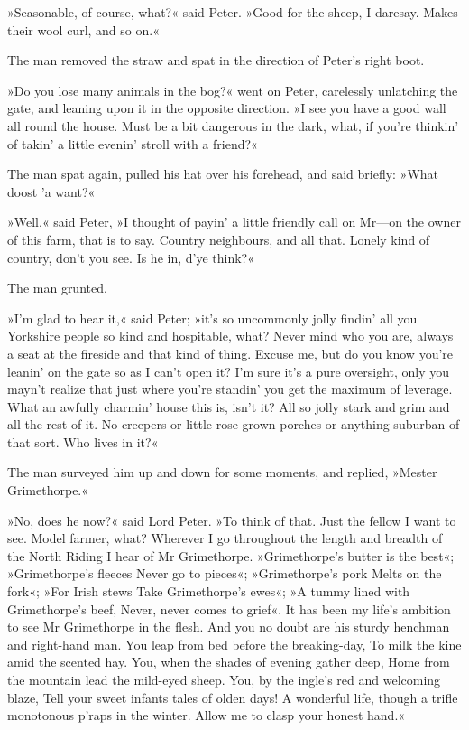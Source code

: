 »Seasonable, of course, what?« said Peter. »Good for the sheep, I daresay. Makes their wool curl, and so on.«

The man removed the straw and spat in the direction of Peter's right boot.

»Do you lose many animals in the bog?« went on Peter, carelessly unlatching the gate, and leaning upon it in the opposite direction. »I see you have a good wall all round the house. Must be a bit dangerous in the dark, what, if you're thinkin' of takin' a little evenin' stroll with a friend?«

The man spat again, pulled his hat over his forehead, and said briefly:
»What doost 'a want?«

»Well,« said Peter, »I thought of payin' a little friendly call on Mr\allowbreak---\allowbreak on the owner of this farm, that is to say. Country neighbours, and all that. Lonely kind of country, don't you see. Is he in, d'ye think?«

The man grunted.

»I'm glad to hear it,« said Peter; »it's so uncommonly jolly findin' all you Yorkshire people so kind and hospitable, what? Never mind who you are, always a seat at the fireside and that kind of thing. Excuse me, but do you know you're leanin' on the gate so as I can't open it?  I'm sure it's a pure oversight, only you mayn't realize that just where you're standin' you get the maximum of leverage. What an awfully charmin' house this is, isn't it? All so jolly stark and grim and all the rest of it. No creepers or little rose-grown porches or anything suburban of that sort. Who lives in it?«

The man surveyed him up and down for some moments, and replied, »Mester Grimethorpe.«

»No, does he now?« said Lord Peter. »To think of that. Just the fellow I want to see. Model farmer, what? Wherever I go throughout the length and breadth of the North Riding I hear of Mr Grimethorpe.  »Grimethorpe's butter is the best«; »Grimethorpe's fleeces Never go to pieces«; »Grimethorpe's pork Melts on the fork«; »For Irish stews Take Grimethorpe's ewes«; »A tummy lined with Grimethorpe's beef, Never, never comes to grief«. It has been my life's ambition to see Mr  Grimethorpe in the flesh. And you no doubt are his sturdy henchman and right-hand man. You leap from bed before the breaking-day, To milk the kine amid the scented hay. You, when the shades of evening gather deep, Home from the mountain lead the mild-eyed sheep. You, by the ingle's red and welcoming blaze, Tell your sweet infants tales of olden days! A wonderful life, though a trifle monotonous p'raps in the winter. Allow me to clasp your honest hand.«


